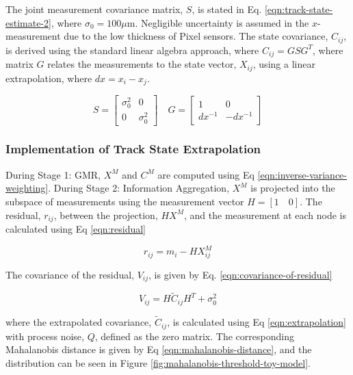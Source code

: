 The joint measurement covariance matrix, $S$, is stated in Eq. \eqref{eqn:track-state-estimate-2}, where $\sigma_0 = 100\mu$m. Negligible uncertainty is assumed in the $x$-measurement due to the low thickness of Pixel sensors. The state covariance, $C_{ij}$, is derived using the standard linear algebra approach, where $C_{ij} = GSG^T$, where matrix $G$ relates the measurements to the state vector, $X_{ij}$, using a linear extrapolation, where $dx = x_i - x_j$.  

\begin{equation}
S = \begin{bmatrix} \sigma_0^{2} & 0 \\ 0 & \sigma_0^{2} \end{bmatrix}  \quad G = \begin{bmatrix} 1 & 0 \\ dx^{-1} & -dx^{-1}  \end{bmatrix}
\label{eqn:track-state-estimate-2}
\end{equation}


\subsubsection{Implementation of Track State Extrapolation}

During Stage 1: GMR, $X^{M}$ and $C^{M}$ are computed using Eq \eqref{eqn:inverse-variance-weighting}. During Stage 2: Information Aggregation, $X^M$ is projected into the subspace of measurements using the measurement vector $H = [1 \quad 0]$. The residual, $r_{ij}$, between the projection, $HX^M$, and the measurement at each node is calculated using Eq \eqref{eqn:residual}

\begin{equation}
r_{ij} = m_i - HX_{ij}^M
\label{eqn:residual}
\end{equation}

The covariance of the residual, $V_{ij}$, is given by Eq. \eqref{eqn:covariance-of-residual}

\begin{equation}
{V}_{ij} = H \widetilde{C}_{ij} H^{T} + \sigma_{0}^{2}
\label{eqn:covariance-of-residual}
\end{equation}

where the extrapolated covariance, $\widetilde{C}_{ij}$, is calculated using Eq \eqref{eqn:extrapolation} with process noise, $Q$, defined as the zero matrix. The corresponding Mahalanobis distance is given by Eq \eqref{eqn:mahalanobis-distance}, and the distribution can be seen in Figure \ref{fig:mahalanobis-threshold-toy-model}.

